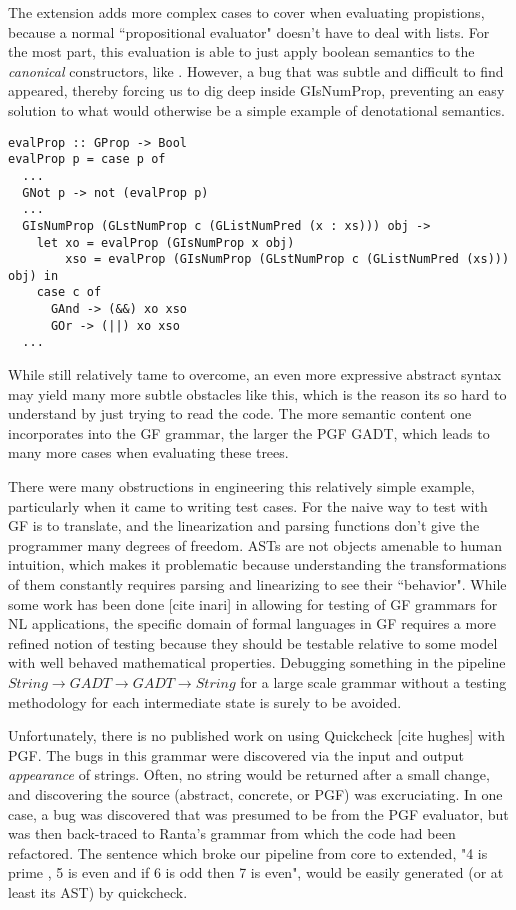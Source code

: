 The extension adds more complex cases  to cover when
evaluating propistions, because a normal ``propositional evaluator" doesn't have to
deal with lists. For the most part, this evaluation is able to just apply
boolean semantics to the \emph{canonical} constructors, like . However, a
bug that was subtle and difficult to find appeared, thereby forcing us to dig
deep inside GIsNumProp, preventing an easy solution to what would otherwise be a
simple example of denotational semantics.
\begin{verbatim}
evalProp :: GProp -> Bool
evalProp p = case p of
  ...
  GNot p -> not (evalProp p)
  ...
  GIsNumProp (GLstNumProp c (GListNumPred (x : xs))) obj ->
    let xo = evalProp (GIsNumProp x obj)
        xso = evalProp (GIsNumProp (GLstNumProp c (GListNumPred (xs))) obj) in
    case c of
      GAnd -> (&&) xo xso
      GOr -> (||) xo xso
  ...
\end{verbatim}
While still relatively tame to overcome, an even more expressive abstract syntax
may yield many more subtle obstacles like this, which is the reason its so hard
to understand by just trying to read the code. The more semantic content one
incorporates into the GF grammar, the larger the PGF GADT, which leads to many
more cases when evaluating these trees.

There were many obstructions in engineering this relatively simple
example, particularly when it came to writing test cases. For the naive
way to test with GF is to translate, and the linearization and parsing functions
don't give the programmer many degrees of freedom. ASTs are not objects amenable
to human intuition, which makes it problematic because understanding the
transformations of them constantly requires parsing and linearizing to see their
``behavior". While some work has been done [cite inari] in allowing for testing
of GF grammars for NL applications, the specific domain of formal languages in
GF requires a more refined notion of testing because they should be testable
relative to some model with well behaved mathematical properties. Debugging
something in the pipeline $String \rightarrow GADT \rightarrow GADT \rightarrow
String$ for a large scale grammar without a testing methodology for each
intermediate state is surely to be avoided.

Unfortunately, there is no published work on using Quickcheck [cite hughes] with
PGF. The bugs in this grammar were discovered via the input and output
\emph{appearance} of strings. Often, no string would be returned after a small
change, and discovering the source (abstract, concrete, or PGF) was
excruciating. In one case, a bug was discovered that was presumed to be from the
PGF evaluator, but was then back-traced to Ranta's grammar from which the code
had been refactored. The sentence which broke our pipeline from core to
extended, "4 is prime , 5 is even and if 6 is odd then 7 is even", would be
easily generated (or at least its AST) by quickcheck.

